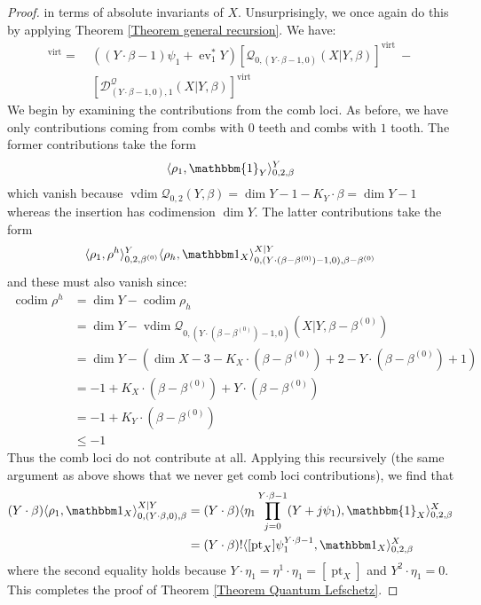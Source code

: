 \documentclass[11pt]{amsart}
\newcommand{\Q}[4]{\mathcal{Q}_{#1,#2}(#3,#4)}
\newcommand{\virt}[1]{[#1]^{\operatorname{virt}}}
\newcommand{\pt}{\operatorname{pt}}
\newcommand{\ev}{\operatorname{ev}}
\newcommand{\codim}{\operatorname{codim}}
\newcommand{\vdim}{\operatorname{vdim}}
\theoremstyle{definition}
\theoremstyle{definition}
\begin{document}
\begin{proof}
in terms of absolute invariants of $X$. Unsurprisingly, we once again do this by applying Theorem \ref{Theorem general recursion}. We have:
\begin{align*} \virt{\Q{0}{(Y \cdot \beta,0)}{X|Y}{\beta}} = \ & ((Y\cdot\beta-1)\psi_1+\ev_1^*Y) \virt{\Q{0}{(Y\cdot\beta-1,0)}{X|Y}{\beta}} \ - \\
& \virt{\mathcal{D}_{(Y\cdot\beta-1,0),1}^{\mathcal Q}(X|Y,\beta)} \end{align*}
We begin by examining the contributions from the comb loci. As before, we have only contributions coming from combs with $0$ teeth and combs with $1$ tooth. The former contributions take the form
\begin{equation*} \langle \rho_1 , \mathbbm{1}_Y \rangle_{0,2,\beta}^Y \end{equation*}
which vanish because $\vdim{\Q{0}{2}{Y}{\beta}} = \dim Y -1 -K_Y\cdot\beta = \dim Y -1$ whereas the insertion has codimension $\dim Y$. The latter contributions take the form
\begin{equation*} \langle \rho_1 ,\rho^h\rangle_{0,2,\beta^{(0)}}^Y \langle \rho_h,\mathbbm 1_{X}\rangle_{0,(Y\cdot(\beta-\beta^{(0)})-1,0),\beta-\beta^{(0)}}^{X|Y}\end{equation*}
and these must also vanish since:
\begin{align*} \codim \rho^h & = \dim Y - \codim \rho_h \\
& = \dim Y - \vdim \Q{0}{(Y\cdot(\beta-\beta^{(0)})-1,0)}{X|Y}{\beta-\beta^{(0)}} \\
& = \dim Y - (\dim X - 3 - K_X \cdot (\beta - \beta^{(0)}) + 2 - Y \cdot (\beta - \beta^{(0)}) + 1) \\
&= -1 + K_X \cdot (\beta-\beta^{(0)}) + Y \cdot (\beta-\beta^{(0)}) \\
& = -1 + K_Y\cdot(\beta-\beta^{(0)}) \\
& \leq -1
\end{align*}
Thus the comb loci do not contribute at all. Applying this recursively (the same argument as above shows that we never get comb loci contributions), we find that
\begin{align*}
(Y\cdot\beta)\langle \rho_1 ,\mathbbm 1_{X}\rangle_{0,(Y\cdot\beta,0),\beta}^{X|Y} & = (Y\cdot\beta) \langle \eta_1 \prod_{j=0}^{Y\cdot\beta-1}(Y+j\psi_1) , \mathbbm{1}_X \rangle_{0,2,\beta}^X \\
& = (Y\cdot\beta)!\langle[ \pt_X]\psi_1^{Y\cdot\beta-1},\mathbbm 1_X\rangle_{0,2,\beta}^X
\end{align*}
where the second equality holds because $Y\cdot\eta_1=\eta^1 \cdot \eta_1 = [\pt_X]$ and $Y^2\cdot\eta_1=0$. This completes the proof of Theorem \ref{Theorem Quantum Lefschetz}. \end{proof}
\end{document}

